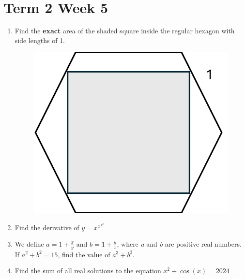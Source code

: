 \documentclass[../main.tex]{subfiles}
\begin{document}
\section*{Term 2 Week 5}
\begin{enumerate}
    \item 
    Find the \textbf{exact} area of the shaded square inside the regular hexagon with side lengths of 1.\\
    \begin{figure}[h]
        \centering
        \includegraphics{images/t2w5q1.png}
    \end{figure}

    \item 
    Find the derivative of \(y=x^{x^{x^{x^{.^{.^{.}}}}}}\)\\

    \item 
    We define \(a=1+\frac{x}{y}\) and \(b=1+\frac{y}{x}\), where \textit{a} and \textit{b} are positive real numbers.\\

    If \(a^2+b^2=15\), find the value of \(a^3+b^3\).\\

    \item 
    Find the sum of all real solutions to the equation \(x^2+\cos{(x)}=2024 \)
    
    \end{enumerate}
\end{document}
